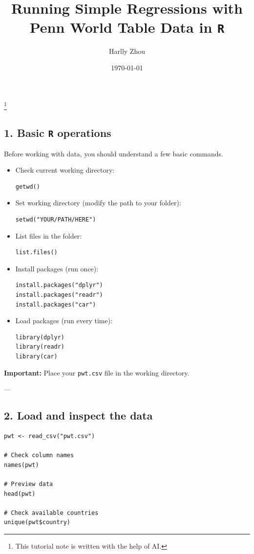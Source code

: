 \documentclass[12pt]{article}
\title{Running Simple Regressions with Penn World Table Data in \texttt{R}}
\author{Harlly Zhou}
\date{\today}
\begin{document}
\maketitle
\footnote{This tutorial note is written with the help of AI.}

\subsection*{1. Basic \texttt{R} operations}

Before working with data, you should understand a few basic commands.

\begin{itemize}
    \item Check current working directory:
\begin{verbatim}
getwd()
\end{verbatim}

    \item Set working directory (modify the path to your folder):
\begin{verbatim}
setwd("YOUR/PATH/HERE")
\end{verbatim}

    \item List files in the folder:
\begin{verbatim}
list.files()
\end{verbatim}

    \item Install packages (run once):
\begin{verbatim}
install.packages("dplyr")
install.packages("readr")
install.packages("car")
\end{verbatim}

    \item Load packages (run every time):
\begin{verbatim}
library(dplyr)
library(readr)
library(car)
\end{verbatim}
\end{itemize}

\textbf{Important:} Place your \texttt{pwt.csv} file in the working directory.

---

\subsection*{2. Load and inspect the data}

\begin{verbatim}
pwt <- read_csv("pwt.csv")

# Check column names
names(pwt)

# Preview data
head(pwt)

# Check available countries
unique(pwt$country)
\end{verbatim}
\end{document}
